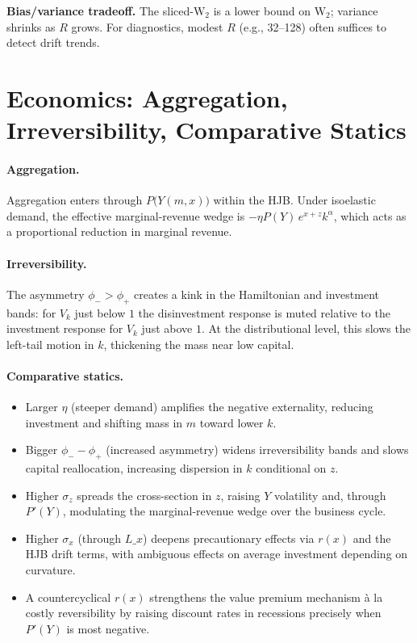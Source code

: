 ﻿\documentclass[11pt,letterpaper,oneside]{article}
\numberwithin{equation}{section}
\newcommand{\1}{\mathbf{1}}
\newcommand{\Lx}{L\_x}
\begin{document}
\begin{tcolorbox}[mathstyle]
\textbf{Bias/variance tradeoff.} The sliced-$\mathrm W_2$ is a lower bound on $\mathrm W_2$; variance shrinks as $R$ grows. For diagnostics, modest $R$ (e.g., 32--128) often suffices to detect drift trends.
\end{tcolorbox}

\section{Economics: Aggregation, Irreversibility, Comparative Statics}

\paragraph{Aggregation.}
Aggregation enters through $P\big(Y(m,x)\big)$ within the HJB. Under isoelastic demand, the effective marginal-revenue wedge is $-\eta P(Y)\,e^{x+z}k^\alpha$, which acts as a proportional reduction in marginal revenue.

\paragraph{Irreversibility.}
The asymmetry $\phi_->\phi_+$ creates a kink in the Hamiltonian and investment bands: for $V_k$ just below $1$ the disinvestment response is muted relative to the investment response for $V_k$ just above $1$. At the distributional level, this slows the left-tail motion in $k$, thickening the mass near low capital.

\paragraph{Comparative statics.}
\begin{itemize}[leftmargin=1.25em]
\item Larger $\eta$ (steeper demand) amplifies the negative externality, reducing investment and shifting mass in $m$ toward lower $k$.
\item Bigger $\phi_- - \phi_+$ (increased asymmetry) widens irreversibility bands and slows capital reallocation, increasing dispersion in $k$ conditional on $z$.
\item Higher $\sigma_z$ spreads the cross-section in $z$, raising $Y$ volatility and, through $P'(Y)$, modulating the marginal-revenue wedge over the business cycle.
\item Higher $\sigma_x$ (through $\Lx$) deepens precautionary effects via $r(x)$ and the HJB drift terms, with ambiguous effects on average investment depending on curvature.
\item A countercyclical $r(x)$ strengthens the value premium mechanism à la costly reversibility by raising discount rates in recessions precisely when $P'(Y)$ is most negative.
\end{itemize}
\end{document}
